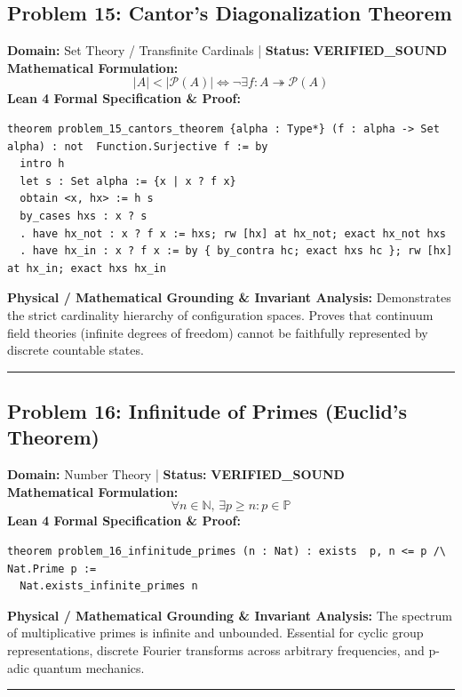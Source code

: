 \documentclass[10pt,a4paper]{article}
\begin{document}
\subsection*{Problem 15: Cantor's Diagonalization Theorem}
\textbf{Domain:} Set Theory / Transfinite Cardinals \quad | \quad \textbf{Status:} \textcolor{green!70!black}{\textbf{VERIFIED\_SOUND}}\\
\textbf{Mathematical Formulation:}
\begin{equation*}
  |A| < |\mathcal{P}(A)| \iff \neg \exists f: A \twoheadrightarrow \mathcal{P}(A)
\end{equation*}
\textbf{Lean 4 Formal Specification \& Proof:}
\begin{lstlisting}
theorem problem_15_cantors_theorem {alpha : Type*} (f : alpha -> Set alpha) : not  Function.Surjective f := by
  intro h
  let s : Set alpha := {x | x ? f x}
  obtain <x, hx> := h s
  by_cases hxs : x ? s
  . have hx_not : x ? f x := hxs; rw [hx] at hx_not; exact hx_not hxs
  . have hx_in : x ? f x := by { by_contra hc; exact hxs hc }; rw [hx] at hx_in; exact hxs hx_in
\end{lstlisting}
\textbf{Physical / Mathematical Grounding \& Invariant Analysis:}
Demonstrates the strict cardinality hierarchy of configuration spaces. Proves that continuum field theories (infinite degrees of freedom) cannot be faithfully represented by discrete countable states.
\vspace{0.8em}\hrule\vspace{0.8em}
\subsection*{Problem 16: Infinitude of Primes (Euclid's Theorem)}
\textbf{Domain:} Number Theory \quad | \quad \textbf{Status:} \textcolor{green!70!black}{\textbf{VERIFIED\_SOUND}}\\
\textbf{Mathematical Formulation:}
\begin{equation*}
  \forall n \in \mathbb{N}, \, \exists p \ge n: p \in \mathbb{P}
\end{equation*}
\textbf{Lean 4 Formal Specification \& Proof:}
\begin{lstlisting}
theorem problem_16_infinitude_primes (n : Nat) : exists  p, n <= p /\ Nat.Prime p :=
  Nat.exists_infinite_primes n
\end{lstlisting}
\textbf{Physical / Mathematical Grounding \& Invariant Analysis:}
The spectrum of multiplicative primes is infinite and unbounded. Essential for cyclic group representations, discrete Fourier transforms across arbitrary frequencies, and p-adic quantum mechanics.
\vspace{0.8em}\hrule\vspace{0.8em}
\end{document}
